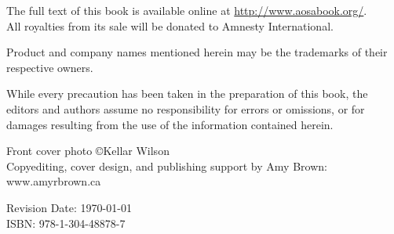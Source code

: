 \vspace{0.15cm}

\noindent
The full text of this book is available online at \url{http://www.aosabook.org/}.\\
All royalties from its sale will be donated to Amnesty International.\\

\vfill

\noindent Product and company names mentioned herein may be the trademarks of
their respective owners.\\

\vspace{0.15cm}

\noindent While every precaution has been taken in the preparation of this
book, the editors and authors assume no responsibility for errors or omissions,
or for damages resulting from the use of the information contained herein.\\

\vspace{0.15cm}

\noindent Front cover photo \copyright Kellar Wilson \\
\noindent Copyediting, cover design, and publishing support by Amy Brown: www.amyrbrown.ca

\vspace{1cm}

\noindent Revision Date: \today \\

\noindent ISBN: 978-1-304-48878-7
\normalsize

\newpage





